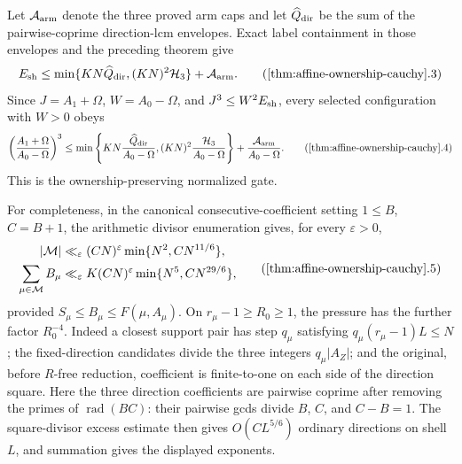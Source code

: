 Let \(\mathcal A_{\rm arm}\) denote the three proved arm caps and let
\(\widehat Q_{\rm dir}\) be the sum of the pairwise-coprime direction-lcm
envelopes.  Exact label containment in those envelopes and the preceding
theorem give
\[
 E_{\rm sh}\le
 \min\{KN\widehat Q_{\rm dir},(KN)^2\mathcal H_3\}
 +\mathcal A_{\rm arm}.
 \tag{\ref{thm:affine-ownership-cauchy}.3}
\]
Since \(J=A_1+\Omega\), \(W=A_0-\Omega\), and
\(J^3\le W^2E_{\rm sh}\), every selected configuration with \(W>0\) obeys
\[
 \left(\frac{A_1+\Omega}{A_0-\Omega}\right)^3
 \le\min\left\{KN\frac{\widehat Q_{\rm dir}}{A_0-\Omega},
  (KN)^2\frac{\mathcal H_3}{A_0-\Omega}\right\}
 +\frac{\mathcal A_{\rm arm}}{A_0-\Omega}.
 \tag{\ref{thm:affine-ownership-cauchy}.4}
\]
This is the ownership-preserving normalized gate.

For completeness, in the canonical consecutive-coefficient setting
\(1\le B\), \(C=B+1\), the arithmetic divisor enumeration gives, for every
\(\varepsilon>0\),
\[
 \begin{aligned}
 |\mathcal M|&\ll_\varepsilon(CN)^\varepsilon
        \min\{N^2,CN^{11/6}\},\\
 \sum_{\mu\in\mathcal M}B_\mu&\ll_\varepsilon
 K(CN)^\varepsilon\min\{N^5,CN^{29/6}\},
 \end{aligned}
 \tag{\ref{thm:affine-ownership-cauchy}.5}
\]
provided \(S_\mu\le B_\mu\le F(\mu,A_\mu)\).  On
\(r_\mu-1\ge R_0\ge1\), the pressure has the further factor \(R_0^{-4}\).
Indeed a closest support pair has step \(q_\mu\) satisfying
\(q_\mu(r_\mu-1)L\le N\); the fixed-direction candidates divide the three
integers \(q_\mu|A_Z|\); and the original, before \(R\)-free reduction,
coefficient is finite-to-one on each side of the direction square.  Here the
three direction coefficients are pairwise coprime after removing the primes
of \(\operatorname{rad}(BC)\): their pairwise gcds divide \(B\), \(C\), and
\(C-B=1\).  The square-divisor excess estimate then gives
\(O(CL^{5/6})\) ordinary
directions on shell \(L\), and summation gives the displayed exponents.

